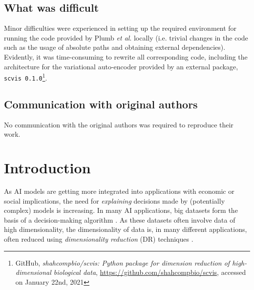 \setcounter{footnote}{1}

\subsection*{What was difficult}
Minor difficulties were experienced in setting up the required environment for running the code provided by Plumb \textit{et al}. locally (i.e. trivial changes in the code such as the usage of absolute paths and obtaining external dependencies). Evidently, it was time-consuming to rewrite all corresponding code, including the architecture for the variational auto-encoder provided by an external package, \texttt{scvis 0.1.0}\footnote{GitHub, \textit{shahcompbio/scvis: Python package for dimension reduction of high-dimensional biological data}, \url{https://github.com/shahcompbio/scvis}, accessed on January 22nd, 2021}.

\subsection*{Communication with original authors}
No communication with the original authors was required to reproduce their work.

\section{Introduction}
As AI models are getting more integrated into applications with economic or social implications, the need for \textit{explaining} decisions made by (potentially complex) models is increasing. In many AI applications, big datasets form the basis of a decision-making algorithm \citep{6547979}. As these datasets often involve data of high dimensionality, the dimensionality of data is, in many different applications, often reduced using \textit{dimensionality reduction} (DR) techniques \citep{van2009dimensionality}.\\

